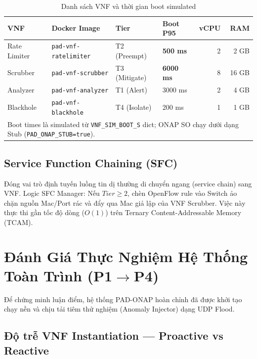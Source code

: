 \documentclass[12pt,a4paper]{article}
\begin{document}
\begin{table}[H]
\centering
\caption{Danh sách VNF và thời gian boot simulated}
\label{tab:vnf_types}
\begin{tabular}{llllrr}
\toprule
\textbf{VNF} & \textbf{Docker Image} & \textbf{Tier} & \textbf{Boot P95} & \textbf{vCPU} & \textbf{RAM} \\
\midrule
Rate Limiter & \texttt{pad-vnf-ratelimiter} & T2 (Preempt)  & \textbf{500 ms}  & 2 & 2 GB \\
Scrubber     & \texttt{pad-vnf-scrubber}     & T3 (Mitigate) & \textbf{6000 ms} & 8 & 16 GB \\
Analyzer     & \texttt{pad-vnf-analyzer}     & T1 (Alert)    & 3000 ms          & 2 & 4 GB  \\
Blackhole    & \texttt{pad-vnf-blackhole}    & T4 (Isolate)  & 200 ms           & 1 & 1 GB  \\
\bottomrule
\multicolumn{6}{l}{\footnotesize Boot times là simulated từ \texttt{VNF\_SIM\_BOOT\_S} dict; ONAP SO chạy dưới dạng Stub (\texttt{PAD\_ONAP\_STUB=true}).}
\end{tabular}
\end{table}

\subsection{Service Function Chaining (SFC)}
Đóng vai trò định tuyến luồng tin dị thường di chuyển ngang (service chain) sang VNF. 
Logic SFC Manager: Nếu $Tier \ge 2$, chèn OpenFlow rule vào Switch ảo chặn nguồn Mac/Port rác và đẩy qua Mac giả lập của VNF Scrubber. Việc này thực thi gần tốc độ dòng ($O(1)$) trên Ternary Content-Addressable Memory (TCAM).

\section{Đánh Giá Thực Nghiệm Hệ Thống Toàn Trình (P1$\rightarrow$P4)}

Để chứng minh luận điểm, hệ thống PAD-ONAP hoàn chỉnh đã được khởi tạo chạy nền và chịu tải tiêm thử nghiệm (Anomaly Injector) dạng UDP Flood.

\subsection{Độ trễ VNF Instantiation — Proactive vs Reactive}
\end{document}
